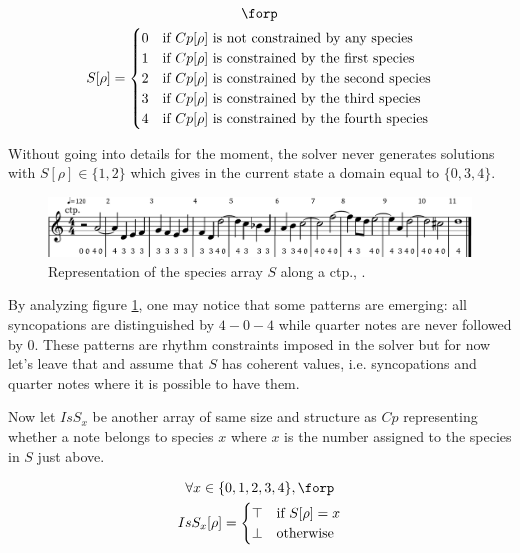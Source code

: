\begin{equation}
    \begin{gathered}
        \forp\\
        S[\rho] = \begin{cases}
            0 & \text{if } Cp[\rho] \text{ is not constrained by any species}\\
            1 & \text{if } Cp[\rho] \text{ is constrained by the first species}\\
            2 & \text{if } Cp[\rho] \text{ is constrained by the second species}\\
            3 & \text{if } Cp[\rho] \text{ is constrained by the third species}\\
            4 & \text{if } Cp[\rho] \text{ is constrained by the fourth species}\\
        \end{cases}\\
    \end{gathered}
\end{equation}

Without going into details for the moment, the solver never generates solutions with $S[\rho] \in \{1, 2\}$ which gives in the current state a domain equal to $\{0, 3, 4\}$.

\begin{figure}[h]
    \centering
    \includegraphics[width=\textwidth]{Images/species_array.png}
    \caption{Representation of the species array $S$ along a ctp., .}
    \label{fig:speciesarray}
\end{figure}

By analyzing figure \ref{fig:speciesarray}, one may notice that some patterns are emerging: all syncopations are distinguished by $4-0-4$ while quarter notes are never followed by $0$. These patterns are rhythm constraints imposed in the solver but for now let's leave that and assume that $S$ has coherent values, i.e. syncopations and quarter notes where it is possible to have them.

Now let $IsS_{x}$ be another array of same size and structure as $Cp$ representing whether a note belongs to species $x$ where $x$ is the number assigned to the species in $S$ just above.

\begin{equation}
    \begin{gathered}
        \forall x \in \{0, 1, 2, 3, 4\}, \forp\\
        IsS_{x}[\rho] = \begin{cases}
            \top & \text{if } S[\rho] = x\\
            \bot & \text{otherwise}
        \end{cases}\\
    \end{gathered}
\end{equation}

